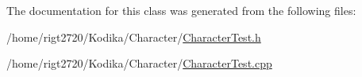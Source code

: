 The documentation for this class was generated from the following files\-:\begin{DoxyCompactItemize}
\item 
/home/rigt2720/\-Kodika/\-Character/\hyperlink{CharacterTest_8h}{Character\-Test.\-h}\item 
/home/rigt2720/\-Kodika/\-Character/\hyperlink{CharacterTest_8cpp}{Character\-Test.\-cpp}\end{DoxyCompactItemize}
